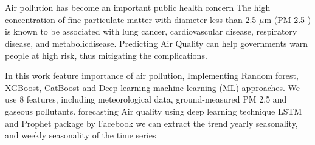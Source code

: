 
%
%
%




%   
%

%
%
%
%
%



\chapter*{}

Air pollution has become an important public health concern The high concentration of fine particulate matter with diameter less than 2.5 $\mu$m (PM 2.5 ) is known to be associated with lung cancer, cardiovascular disease, respiratory disease, and metabolicdisease.
Predicting Air Quality can help governments warn people at high risk, thus mitigating the complications. 
\par In this work feature importance of air pollution, Implementing Random forest, XGBoost, CatBoost and Deep learning machine learning (ML) approaches.
We use 8 features, including meteorological data, ground-measured PM 2.5 and gaseous pollutants. forecasting Air quality using deep learning technique LSTM and Prophet package by Facebook we can extract the trend yearly seasonality, and weekly seasonality of the time series 

